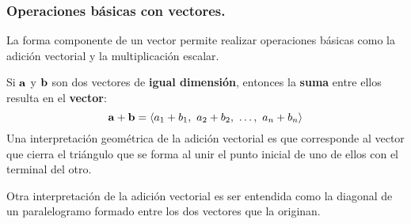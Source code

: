 \documentclass[12pt]{article}
\begin{document}
\subsubsection{Operaciones básicas con vectores.}

La forma componente de un vector permite realizar operaciones básicas como la adición vectorial y la multiplicación escalar.

Si $\mathbf{a}$ y $\mathbf{b}$ son dos vectores de \textbf{igual dimensión}, entonces la \textbf{suma} entre ellos resulta en el \textbf{vector}:
\[
  \mathbf{a} + \mathbf{b} = \langle a_{1} + b_{1}, \ a_{2} + b_{2}, \ \ldots, \ a_{n} + b_{n} \rangle
\]
Una interpretación geométrica de la adición vectorial es que corresponde al vector que cierra el triángulo que se forma al unir el punto inicial de uno de ellos con el terminal del otro.

\newpage

\begin{figure}[hbt!]
\centering


\end{figure}

Otra interpretación de la adición vectorial es ser entendida como la diagonal de un paralelogramo formado entre los dos vectores que la originan.

\begin{figure}[hbt!]
\centering


\end{figure}
\end{document}
